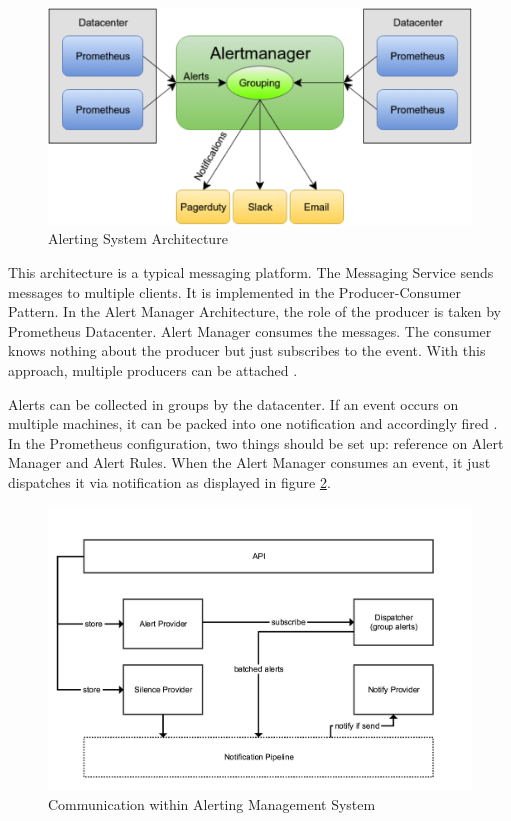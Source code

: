 \begin{figure}[htbp]
\begin{center}
  \includegraphics[scale=0.6]{components/3/alert_arch.png}
  \caption{Alerting System Architecture}
  \label{fig:alert_arch}
\end{center}
\end{figure}

This architecture is a typical messaging platform.
The Messaging Service sends messages to multiple clients. It is implemented in the Producer-Consumer Pattern. In the Alert Manager Architecture, the role of the producer is taken by Prometheus Datacenter. Alert Manager consumes the messages. The consumer knows nothing about the producer but just subscribes to the event. With this approach, multiple producers can be attached \cite{alert_book}. 

Alerts can be collected in groups by the datacenter. If an event occurs on multiple machines, it can be packed into one notification and accordingly fired . 
In the Prometheus configuration, two things should be set up: reference on Alert Manager and Alert Rules. When the Alert Manager consumes an event, it just dispatches it via notification as displayed in figure \ref{fig:alert_arch_detailed}.

\begin{figure}[H]
\begin{center}
  \includegraphics[width=\linewidth]{components/3/alert_details.png}
  \caption{Communication within Alerting Management System}
  \label{fig:alert_arch_detailed}
\end{center}
\end{figure}

